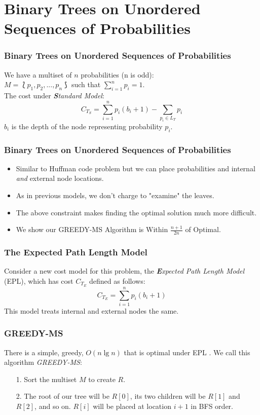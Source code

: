 \documentclass[]{beamer}
\theoremstyle{plain}
\begin{document}
\section{Binary Trees on Unordered Sequences of Probabilities}\label{BST over Multisets}

\begin{frame} \frametitle{Binary Trees on Unordered Sequences of Probabilities}
We have a multiset of $n$ probabilities (n is odd): \\
$M = \lbag p_1, p_2, ..., p_n \rbag$ such that $\sum\limits_{i=1}^n p_i = 1$.  \\
The cost under \textit{\textbf{S}tandard Model}:
\begin{equation}
C_{T_S} = \sum_{i=1}^{n} p_i(b_i+1) - \sum_{p_i \in L_T} p_i
\end{equation}
$b_i$ is the depth of the node representing probability $p_i$.
\end{frame}

\begin{frame} \frametitle{Binary Trees on Unordered Sequences of Probabilities}
\begin{itemize}
\item Similar to Huffman code problem but we can place probabilities and internal \textit{and} external node locations.
\item As in previous models, we don't charge to "examine" the leaves.
\item The above constraint makes finding the optimal solution much more difficult.
\item We show our GREEDY-MS Algorithm is Within $\frac{n+1}{2n}$ of Optimal.
\end{itemize}
\end{frame}



\begin{frame} \frametitle{The \textbf{E}xpected Path Length Model}
Consider a new cost model for this problem, the \textit{\textbf{E}xpected Path Length Model} (EPL), which has cost $C_{T_E}$ defined as follows:
\begin{equation}
C_{T_E} = \sum_{i=1}^{n} p_i(b_i+1)
\end{equation}
This model treats internal and external nodes the same.
\end{frame}

\begin{frame} \frametitle{GREEDY-MS}
There is a simple, greedy, $O(n \lg n)$ that is optimal under EPL \cite{golin2012huffman}. We call this algorithm \textit{GREEDY-MS}:

\begin{itemize}
\item[1.] Sort the multiset $M$ to create $R$.

\item[2.] The root of our tree will be $R[0]$, its two children will be $R[1]$ and $R[2]$, and so on. $R[i]$ will be placed at location $i+1$ in BFS order.
\end{itemize}
\end{frame}
\end{document}
